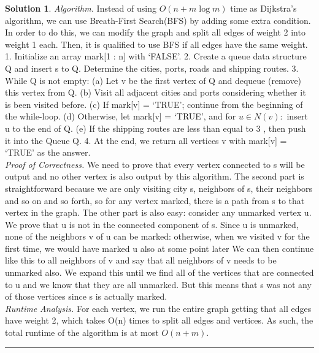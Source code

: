 \documentclass{article}
\theoremstyle{definition}
\def\fline{\rule{0.75\linewidth}{0.5pt}}
\newcommand{\finishline}{\begin{center}\fline\end{center}}
\newtheorem*{solution*}{Solution}
\newenvironment{solution}{\begin{solution*}}{{\finishline} \end{solution*}}
\begin{document}
\medskip

\begin{solution}
	 
	\emph{Algorithm.} Instead of using $O(n+m\log{m})$ time as Dijkstra's algorithm, we can use Breath-First Search(BFS) by adding some extra condition. In order to do this, we can modify the graph and split all edges of weight 2 into weight 1 each. Then, it is qualified to use BFS if all edges have the same weight.
	1. Initialize an array mark[1 : n] with ‘FALSE’. 
	2. Create a queue data structure Q and insert s to Q. Determine the cities, ports, roads and shipping routes.
	3. While Q is not empty: (a) Let v be the first vertex of Q and dequeue (remove) this vertex from Q. (b) Visit all adjacent cities and ports considering whether it is been visited before. (c) If mark[v] = ‘TRUE’; continue from the beginning of the while-loop. (d) Otherwise, let mark[v] = ‘TRUE’, and for $u \in N(v):$ insert u to the end of Q. (e) If the shipping routes are less than equal to 3 , then push it into the Queue Q.
	4. At the end, we return all vertices v with mark[v] = ‘TRUE’ as the answer. \\

	\emph{Proof of Correctness.} We need to prove that every vertex connected to s will be output and no other vertex is also output by this algorithm. The second part is straightforward because we are only visiting city s, neighbors of s, their neighbors and so on and so forth, so for any vertex marked, there is a path from s to that vertex in the graph. The other part is also easy: consider any unmarked vertex u. We prove that u is not in the connected component of s. Since u is unmarked, none of the neighbors v of u can be marked: otherwise, when we visited v for the first time, we would have marked u also at some point later We can then continue like this to all neighbors of v  and say that all neighbors of v needs to be unmarked also. We expand this until we find all of the vertices that are connected to u and we know that they are all unmarked. But this means that s was not any of those vertices since s is actually marked.\\

	\emph{Runtime Analysis.} For each vertex, we run the entire graph getting that all edges have weight 2, which takes O(n) times to split all edges and vertices. As such, the total runtime of the algorithm is at most $O(n + m)$. \\
 
\end{solution}
\end{document}
